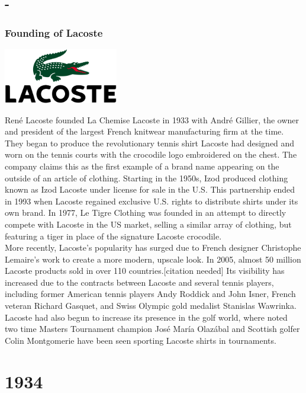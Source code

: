 \documentclass[11pt]{report}
\begin{document}
\section{-}
\subsection{Founding of Lacoste}
\vspace{2mm}\begin{center}\includegraphics[width=5cm]{./img/lacosteLogo.jpg}\end{center}
René Lacoste founded La Chemise Lacoste in 1933 with André Gillier, the owner and president of the largest French knitwear manufacturing firm at the time. They began to produce the revolutionary tennis shirt Lacoste had designed and worn on the tennis courts with the crocodile logo embroidered on the chest. The company claims this as the first example of a brand name appearing on the outside of an article of clothing. Starting in the 1950s, Izod produced clothing known as Izod Lacoste under license for sale in the U.S. This partnership ended in 1993 when Lacoste regained exclusive U.S. rights to distribute shirts under its own brand. In 1977, Le Tigre Clothing was founded in an attempt to directly compete with Lacoste in the US market, selling a similar array of clothing, but featuring a tiger in place of the signature Lacoste crocodile.\\
\indent More recently, Lacoste's popularity has surged due to French designer Christophe Lemaire’s work to create a more modern, upscale look. In 2005, almost 50 million Lacoste products sold in over 110 countries.[citation needed] Its visibility has increased due to the contracts between Lacoste and several tennis players, including former American tennis players Andy Roddick and John Isner, French veteran Richard Gasquet, and Swiss Olympic gold medalist Stanislas Wawrinka. Lacoste had also begun to increase its presence in the golf world, where noted two time Masters Tournament champion José María Olazábal and Scottish golfer Colin Montgomerie have been seen sporting Lacoste shirts in tournaments.

\chapter{1934}
\end{document}
